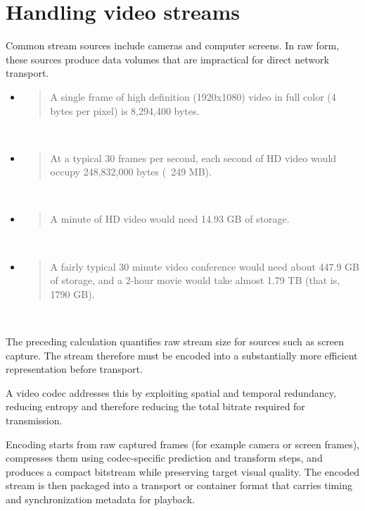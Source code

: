\section{Handling video streams}
Common stream sources include cameras and computer screens. In raw form, these sources produce data volumes that are impractical for direct network transport.~\cite{WebVideoCodec2025,apostolopoulosVideoStreamingConcepts}

\begin{itemize}
    \item \begin{quote}A single frame of high definition (1920x1080) video in full color (4 bytes per pixel) is 8,294,400 bytes.\end{quote}~\cite{WebVideoCodec2025}
    \item \begin{quote}At a typical 30 frames per second, each second of HD video would occupy 248,832,000 bytes (~249 MB).\end{quote}~\cite{WebVideoCodec2025}
    \item \begin{quote}A minute of HD video would need 14.93 GB of storage.\end{quote}~\cite{WebVideoCodec2025}
    \item \begin{quote}A fairly typical 30 minute video conference would need about 447.9 GB of storage, and a 2-hour movie would take almost 1.79 TB (that is, 1790 GB).\end{quote}~\cite{WebVideoCodec2025}
\end{itemize}

The preceding calculation quantifies raw stream size for sources such as screen capture. The stream therefore must be encoded into a substantially more efficient representation before transport.

A video codec addresses this by exploiting spatial and temporal redundancy, reducing entropy and therefore reducing the total bitrate required for transmission.~\cite{apostolopoulosVideoStreamingConcepts,WebVideoCodec2025}

Encoding starts from raw captured frames (for example camera or screen frames), compresses them using codec-specific prediction and transform steps, and produces a compact bitstream while preserving target visual quality. The encoded stream is then packaged into a transport or container format that carries timing and synchronization metadata for playback.~\cite{apostolopoulosVideoStreamingConcepts,WebVideoCodec2025}

